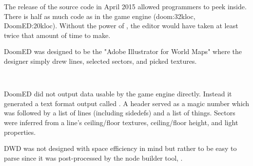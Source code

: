 The release of the source code in April 2015 allowed programmers to peek inside. There is half as much code as in the game engine (doom:32kloc, DoomED:20kloc). Without the power of \NeXTns, the editor would have taken at least twice that amount of time to make.



\par
DoomED was designed to be the "Adobe Illustrator for World Maps" where the designer simply drew lines, selected sectors, and picked textures.\\
\par
\vspace{10pt}
\\
\par
{}

DoomED did not output data usable by the game engine directly. Instead it generated a text format output called . A header served as a magic number which was followed by a list of lines (including sidedefs) and a list of things. Sectors were inferred from a line's ceiling/floor textures, ceiling/floor height, and light properties.\\
\par
{}
\par
DWD was not designed with space efficiency in mind but rather to be easy to parse since it was post-processed by the node builder tool, .\\
\par
{}
\par

\pagebreak





